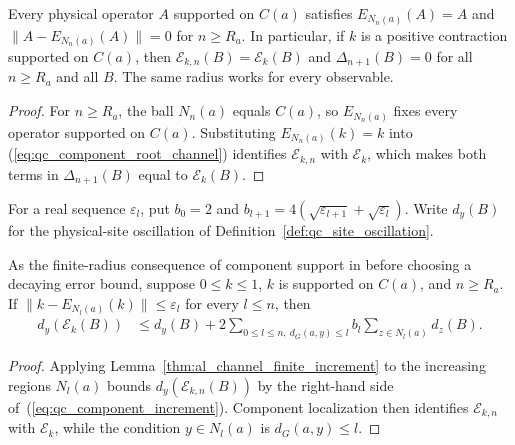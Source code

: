 \begin{lemma}
    \label{thm:qc_component_channel_stabilization}
    \leanok
    Every physical operator $A$ supported on $C(a)$ satisfies
    $E_{N_n(a)}(A)=A$ and $\|A-E_{N_n(a)}(A)\|=0$ for $n\ge R_a$.
    In particular, if $k$ is a positive contraction supported on $C(a)$,
    then $\mathcal E_{k,n}(B)=\mathcal E_k(B)$ and
    $\Delta_{n+1}(B)=0$ for all $n\ge R_a$ and all $B$.
    The same radius works for every observable.
\end{lemma}
\begin{proof}
    \leanok
    For $n\ge R_a$, the ball $N_n(a)$ equals $C(a)$, so $E_{N_n(a)}$ fixes
    every operator supported on $C(a)$. Substituting $E_{N_n(a)}(k)=k$ into
    (\ref{eq:qc_component_root_channel}) identifies $\mathcal E_{k,n}$ with
    $\mathcal E_k$, which makes both terms in $\Delta_{n+1}(B)$ equal to
    $\mathcal E_k(B)$.
\end{proof}

For a real sequence $\varepsilon_l$, put $b_0=2$ and
$b_{l+1}=4(\sqrt{\varepsilon_{l+1}}+\sqrt{\varepsilon_l})$.
Write $d_y(B)$ for the physical-site oscillation of
Definition~\ref{def:qc_site_oscillation}.

\begin{lemma}
    \label{thm:qc_component_channel_increment}
    \leanok
    As the finite-radius consequence of component support in
    \cite{OpenAI2026AreaLaw} before choosing a decaying error bound,
    suppose $0\le k\le1$, $k$ is supported on $C(a)$, and $n\ge R_a$.
    If $\|k-E_{N_l(a)}(k)\|\le\varepsilon_l$ for every $l\le n$, then
    \begin{align}
        \label{eq:qc_component_increment}
        d_y(\mathcal E_k(B))
         & \le d_y(B)+2\sum_{0\le l\le n,\ d_G(a,y)\le l}
        b_l\sum_{z\in N_l(a)}d_z(B).
    \end{align}
\end{lemma}
\begin{proof}
    \leanok
    Applying Lemma~\ref{thm:al_channel_finite_increment} to the increasing
    regions $N_l(a)$ bounds $d_y(\mathcal E_{k,n}(B))$ by the right-hand side
    of~(\ref{eq:qc_component_increment}).
    Component localization then identifies $\mathcal E_{k,n}$ with
    $\mathcal E_k$, while the condition $y\in N_l(a)$ is $d_G(a,y)\le l$.
\end{proof}


